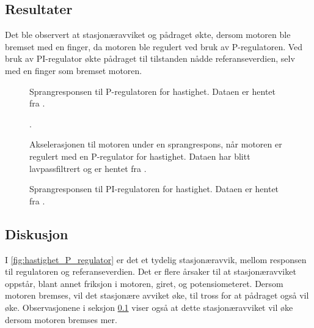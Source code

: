 \subsection{Resultater}

\label{obs:hastighet_regulator_breming_med_finger}
Det ble observert at stasjonæravviket og pådraget økte, dersom motoren ble bremset med en finger, da motoren ble regulert ved bruk av P-regulatoren. Ved bruk av PI-regulator økte pådraget til tilstanden nådde referanseverdien, selv med en finger som bremset motoren.

\begin{figure}[h]
    \centering
    
    \caption{Sprangresponsen til P-regulatoren for hastighet. Dataen er hentet fra \cite{EksempelData}.}
    \label{fig:hastighet_P_regulator}
\end{figure}

\begin{figure}[h]
    \centering
    
    \caption{
        Akselerasjonen til motoren under en sprangrespons, når motoren er regulert med en P-regulator for hastighet.
        Dataen har blitt lavpassfiltrert og er hentet fra \cite{EksempelData}.
    }.
    \label{fig:hastighet_P_regulator_derivert}
\end{figure}

\begin{figure}[h]
    \centering
    
    \caption{Sprangresponsen til PI-regulatoren for hastighet. Dataen er hentet fra \cite{EksempelData}.}
    \label{fig:hastighet_PI_regulator}
\end{figure}






\subsection{Diskusjon}

I \autoref{fig:hastighet_P_regulator} er det et tydelig stasjonæravvik, mellom responsen til regulatoren og referanseverdien. Det er flere årsaker til at stasjonæravviket oppstår, blant annet friksjon i motoren, giret, og potensiometeret. Dersom motoren bremses, vil det stasjonære avviket øke, til tross for at pådraget også vil øke. Observasjonene i seksjon \ref{obs:hastighet_regulator_breming_med_finger} viser også at dette stasjonæravviket vil øke dersom motoren bremses mer.

